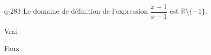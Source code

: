 \begin{truefalse}{q-283}
Le domaine de définition de l'expression $\dfrac{x-1}{x+1}$ est $\mathbb R \setminus \{-1\}$.
\item* Vrai
\item Faux
\end{truefalse}

